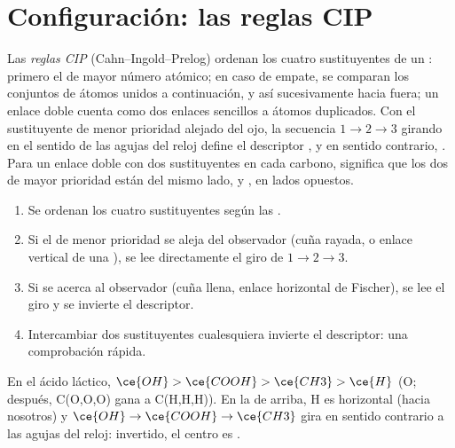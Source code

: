 \section{Configuración: las reglas CIP}

\begin{definition}\label{def:b1:stereochemistry-in-depth:cip}
Las \emph{reglas CIP} (Cahn--Ingold--Prelog) ordenan los
cuatro sustituyentes de un : primero el de mayor
número atómico; en caso de empate, se comparan los conjuntos de átomos
unidos a continuación, y así sucesivamente hacia fuera; un enlace doble
cuenta como dos enlaces sencillos a átomos duplicados. Con el
sustituyente de menor prioridad alejado del ojo, la secuencia
$1 \to 2 \to 3$ girando en el sentido de las agujas del reloj define el
descriptor , y en sentido contrario, . Para un enlace doble
con dos sustituyentes en cada carbono,  significa que los dos de
mayor prioridad están del mismo lado, y , en lados opuestos.
\end{definition}

\begin{method}\label{met:b1:stereochemistry-in-depth:cip}
\begin{enumerate}
  \item Se ordenan los cuatro sustituyentes según las .
  \item Si el de menor prioridad se aleja del observador (cuña rayada, o
        enlace vertical de una ), se lee
        directamente el giro de $1 \to 2 \to 3$.
  \item Si se acerca al observador (cuña llena, enlace horizontal de
        Fischer), se lee el giro y se invierte el descriptor.
  \item Intercambiar dos sustituyentes cualesquiera invierte el
        descriptor: una comprobación rápida.
\end{enumerate}
En el ácido láctico, $\ce{OH} > \ce{COOH} > \ce{CH3} > \ce{H}$ (O; después,
C(O,O,O) gana a C(H,H,H)). En la  de arriba, H es
horizontal (hacia nosotros) y $\ce{OH} \to \ce{COOH} \to \ce{CH3}$ gira en
sentido contrario a las agujas del reloj: invertido, el centro es
.
\end{method}

